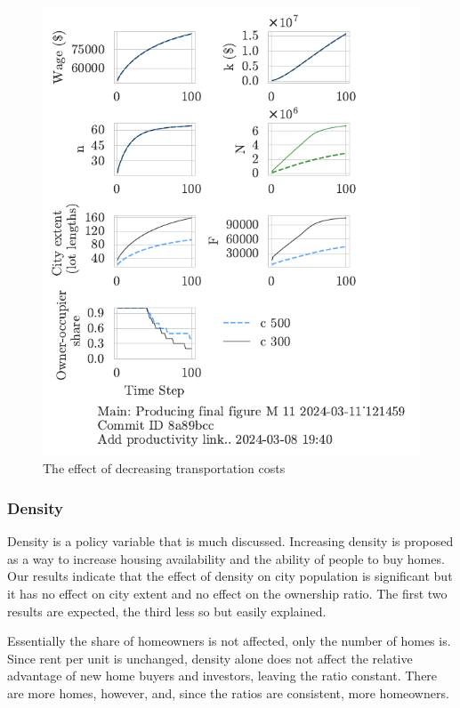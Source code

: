 \begin{figure}[h!t]
    \centering
    \includegraphics[scale=.8, trim={0 1.4cm 0 0},clip]{fig/c-Main-121459.pdf}
    \caption{The effect of decreasing transportation costs}
    \label{fig:c_ownership_trajectory}
\end{figure}


\newpage
\subsubsection{Density}
Density is a policy variable that is much discussed. Increasing density is proposed as a way to increase housing availability and the ability of people to buy homes. Our results indicate that the effect of density on city population is significant but it has no effect on city extent and no effect on the ownership ratio. The first two results are expected, the third less so but easily explained. 

Essentially the share of homeowners is not affected, only the number of homes is. Since rent per unit is unchanged, density alone does not affect the relative advantage of new home buyers and investors, leaving the ratio constant. There are more homes, however, and, since the ratios are consistent, more homeowners. 

